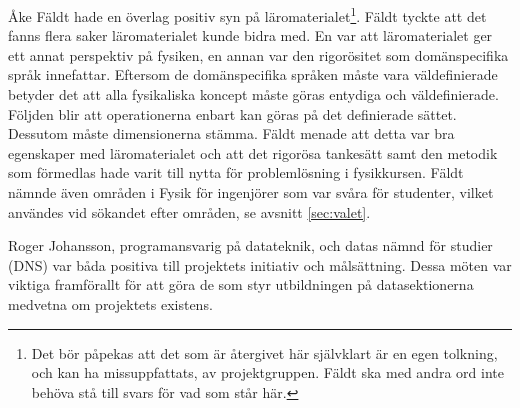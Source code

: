 Åke Fäldt hade en överlag positiv syn på läromaterialet\footnote{Det bör
påpekas att det som är återgivet här självklart är en egen tolkning, och kan ha
missuppfattats, av projektgruppen. Fäldt ska med andra ord inte behöva stå till
svars för vad som står här.}. Fäldt tyckte att det fanns flera saker
läromaterialet kunde bidra med. En var att läromaterialet ger ett annat
perspektiv på fysiken, en annan var den rigorösitet som
domänspecifika språk innefattar. Eftersom de domänspecifika språken måste vara
väldefinierade betyder det att alla fysikaliska koncept måste göras entydiga och väldefinierade. 
Följden blir att operationerna enbart kan göras på det definierade sättet. 
Dessutom måste dimensionerna stämma.
Fäldt menade att detta var bra egenskaper med läromaterialet och att det rigorösa
tankesätt samt den metodik som förmedlas hade varit till nytta för problemlösning i
fysikkursen. Fäldt nämnde även områden i Fysik för ingenjörer som var
svåra för studenter, vilket användes vid sökandet efter områden, se avsnitt \ref{sec:valet}.

Roger Johansson, programansvarig på datateknik, och datas nämnd för studier (DNS)
var båda positiva till projektets initiativ och målsättning. Dessa möten var viktiga framförallt
för att göra de som styr utbildningen på datasektionerna medvetna om projektets existens.
